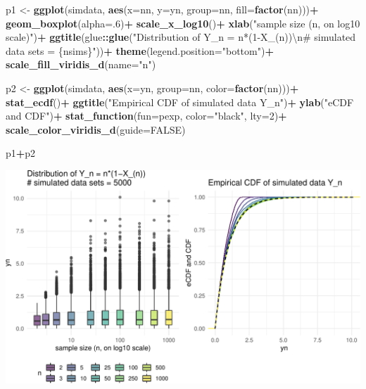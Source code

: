 \documentclass[11pt,]{article}
\newenvironment{Shaded}{\begin{snugshade}}{\end{snugshade}}
\newcommand{\CharTok}[1]{\textcolor[rgb]{0.31,0.60,0.02}{#1}}
\newcommand{\DataTypeTok}[1]{\textcolor[rgb]{0.13,0.29,0.53}{#1}}
\newcommand{\DecValTok}[1]{\textcolor[rgb]{0.00,0.00,0.81}{#1}}
\newcommand{\KeywordTok}[1]{\textcolor[rgb]{0.13,0.29,0.53}{\textbf{#1}}}
\newcommand{\NormalTok}[1]{#1}
\newcommand{\OperatorTok}[1]{\textcolor[rgb]{0.81,0.36,0.00}{\textbf{#1}}}
\newcommand{\OtherTok}[1]{\textcolor[rgb]{0.56,0.35,0.01}{#1}}
\newcommand{\StringTok}[1]{\textcolor[rgb]{0.31,0.60,0.02}{#1}}
\begin{document}
\begin{Shaded}
\begin{Highlighting}[]
\NormalTok{p1 <-}\StringTok{ }\KeywordTok{ggplot}\NormalTok{(simdata, }\KeywordTok{aes}\NormalTok{(}\DataTypeTok{x=}\NormalTok{nn, }\DataTypeTok{y=}\NormalTok{yn, }\DataTypeTok{group=}\NormalTok{nn, }\DataTypeTok{fill=}\KeywordTok{factor}\NormalTok{(nn)))}\OperatorTok{+}
\StringTok{  }\KeywordTok{geom_boxplot}\NormalTok{(}\DataTypeTok{alpha=}\NormalTok{.}\DecValTok{6}\NormalTok{)}\OperatorTok{+}
\StringTok{  }\KeywordTok{scale_x_log10}\NormalTok{()}\OperatorTok{+}
\StringTok{  }\KeywordTok{xlab}\NormalTok{(}\StringTok{"sample size (n, on log10 scale)"}\NormalTok{)}\OperatorTok{+}
\StringTok{  }\KeywordTok{ggtitle}\NormalTok{(glue}\OperatorTok{::}\KeywordTok{glue}\NormalTok{(}\StringTok{"Distribution of Y_n = n*(1-X_(n))}\CharTok{\textbackslash{}n}\StringTok{# simulated data sets = \{nsims\}"}\NormalTok{))}\OperatorTok{+}
\StringTok{  }\KeywordTok{theme}\NormalTok{(}\DataTypeTok{legend.position=}\StringTok{"bottom"}\NormalTok{)}\OperatorTok{+}
\StringTok{  }\KeywordTok{scale_fill_viridis_d}\NormalTok{(}\DataTypeTok{name=}\StringTok{"n"}\NormalTok{)}

\NormalTok{p2 <-}\StringTok{ }\KeywordTok{ggplot}\NormalTok{(simdata, }\KeywordTok{aes}\NormalTok{(}\DataTypeTok{x=}\NormalTok{yn, }\DataTypeTok{group=}\NormalTok{nn, }\DataTypeTok{color=}\KeywordTok{factor}\NormalTok{(nn)))}\OperatorTok{+}
\StringTok{  }\KeywordTok{stat_ecdf}\NormalTok{()}\OperatorTok{+}
\StringTok{  }\KeywordTok{ggtitle}\NormalTok{(}\StringTok{"Empirical CDF of simulated data Y_n"}\NormalTok{)}\OperatorTok{+}
\StringTok{  }\KeywordTok{ylab}\NormalTok{(}\StringTok{"eCDF and CDF"}\NormalTok{)}\OperatorTok{+}
\StringTok{  }\KeywordTok{stat_function}\NormalTok{(}\DataTypeTok{fun=}\NormalTok{pexp, }\DataTypeTok{color=}\StringTok{"black"}\NormalTok{, }\DataTypeTok{lty=}\DecValTok{2}\NormalTok{)}\OperatorTok{+}
\StringTok{  }\KeywordTok{scale_color_viridis_d}\NormalTok{(}\DataTypeTok{guide=}\OtherTok{FALSE}\NormalTok{)}

\NormalTok{p1}\OperatorTok{+}\NormalTok{p2}
\end{Highlighting}
\end{Shaded}

\begin{center}\includegraphics[width=1\linewidth]{class_notes_files/figure-latex/unnamed-chunk-11-1} \end{center}
\end{document}
